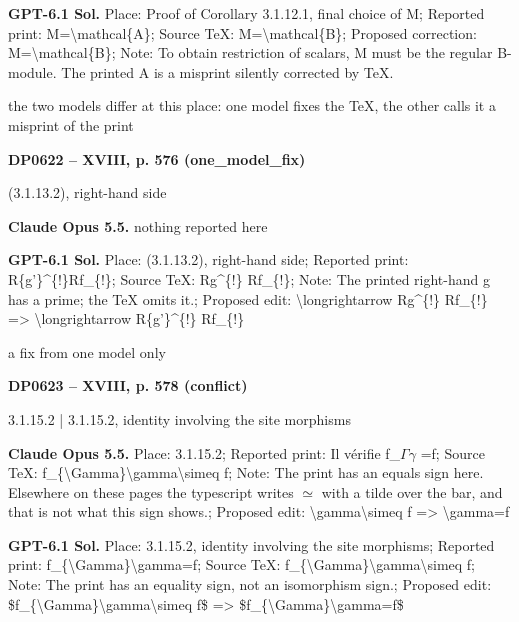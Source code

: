 \textbf{GPT-6.1 Sol.} Place: Proof of Corollary 3.1.12.1, final choice of M; Reported print: M=\allowbreak \textbackslash{}mathcal\{A\}; Source TeX: M=\allowbreak \textbackslash{}mathcal\{B\}; Proposed correction: M=\allowbreak \textbackslash{}mathcal\{B\}; Note: To obtain restriction of scalars, M must be the regular B-module. The printed A is a misprint silently corrected by TeX.\par
the two models differ at this place: one model fixes the TeX, the other calls it a misprint of the print\par
\par\noindent\hypertarget{DP0622}{}\textbf{DP0622 -- XVIII, p. 576 (one\_model\_fix)}\par
(3.1.13.2), right-hand side\par
\textbf{Claude Opus 5.5.} nothing reported here\par
\textbf{GPT-6.1 Sol.} Place: (3.1.13.2), right-hand side; Reported print: R\{g'\}\textasciicircum{}\{!\}Rf\_\{!\}; Source TeX: Rg\textasciicircum{}\{!\} Rf\_\{!\}; Note: The printed right-hand g has a prime; the TeX omits it.; Proposed edit: \textbackslash{}longrightarrow Rg\textasciicircum{}\{!\} Rf\_\{!\} =\allowbreak > \textbackslash{}longrightarrow R\{g'\}\textasciicircum{}\{!\} Rf\_\{!\}\par
a fix from one model only\par
\par\noindent\hypertarget{DP0623}{}\textbf{DP0623 -- XVIII, p. 578 (conflict)}\par
3.1.15.2 | 3.1.15.2, identity involving the site morphisms\par
\textbf{Claude Opus 5.5.} Place: 3.1.15.2; Reported print: Il vérifie f\_\ensuremath{\Gamma}\ensuremath{\gamma} =\allowbreak  f; Source TeX: f\_\{\textbackslash{}Gamma\}\textbackslash{}gamma\textbackslash{}simeq f; Note: The print has an equals sign here. Elsewhere on these pages the typescript writes \ensuremath{\simeq} with a tilde over the bar, and that is not what this sign shows.; Proposed edit: \textbackslash{}gamma\textbackslash{}simeq f =\allowbreak > \textbackslash{}gamma=\allowbreak  f\par
\textbf{GPT-6.1 Sol.} Place: 3.1.15.2, identity involving the site morphisms; Reported print: f\_\{\textbackslash{}Gamma\}\textbackslash{}gamma=\allowbreak f; Source TeX: f\_\{\textbackslash{}Gamma\}\textbackslash{}gamma\textbackslash{}simeq f; Note: The print has an equality sign, not an isomorphism sign.; Proposed edit: \$f\_\{\textbackslash{}Gamma\}\textbackslash{}gamma\textbackslash{}simeq f\$ =\allowbreak > \$f\_\{\textbackslash{}Gamma\}\textbackslash{}gamma=\allowbreak f\$\par
